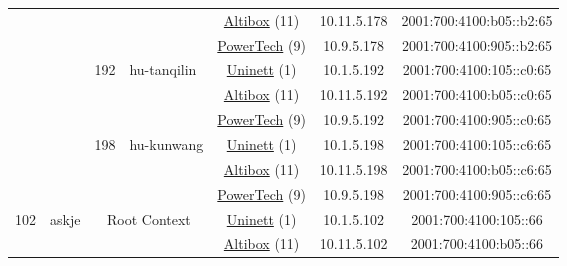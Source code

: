 \begin{small}
\begin{center}
\begin{longtable}{|c|c|c|c|c|c|c|c|}
  &  &  &  & \multicolumn{2}{|c|}{\tiny{\href{https://www.altibox.no}{Altibox} (11)}} & \tiny{10.11.5.178} & \tiny{2001:700:4100:b05::b2:65} \\* \cline{5-5}\cline{6-6}\cline{7-7}\cline{8-8}
  &  &  &  & \multicolumn{2}{|c|}{\tiny{\href{http://www.powertech.no}{PowerTech} (9)}} & \tiny{10.9.5.178} & \tiny{2001:700:4100:905::b2:65} \\* \cline{3-3}\cline{4-4}\cline{5-5}\cline{6-6}\cline{7-7}\cline{8-8}
  &  & \multirow{3}{*}{\tiny{192}} & \multicolumn{1}{|l|}{\multirow{3}{*}{\tiny{hu-tanqilin}}} & \multicolumn{2}{|c|}{\tiny{\href{https://www.uninett.no}{Uninett} (1)}} & \tiny{10.1.5.192} & \tiny{2001:700:4100:105::c0:65} \\* \cline{5-5}\cline{6-6}\cline{7-7}\cline{8-8}
  &  &  &  & \multicolumn{2}{|c|}{\tiny{\href{https://www.altibox.no}{Altibox} (11)}} & \tiny{10.11.5.192} & \tiny{2001:700:4100:b05::c0:65} \\* \cline{5-5}\cline{6-6}\cline{7-7}\cline{8-8}
  &  &  &  & \multicolumn{2}{|c|}{\tiny{\href{http://www.powertech.no}{PowerTech} (9)}} & \tiny{10.9.5.192} & \tiny{2001:700:4100:905::c0:65} \\* \cline{3-3}\cline{4-4}\cline{5-5}\cline{6-6}\cline{7-7}\cline{8-8}
  &  & \multirow{3}{*}{\tiny{198}} & \multicolumn{1}{|l|}{\multirow{3}{*}{\tiny{hu-kunwang}}} & \multicolumn{2}{|c|}{\tiny{\href{https://www.uninett.no}{Uninett} (1)}} & \tiny{10.1.5.198} & \tiny{2001:700:4100:105::c6:65} \\* \cline{5-5}\cline{6-6}\cline{7-7}\cline{8-8}
  &  &  &  & \multicolumn{2}{|c|}{\tiny{\href{https://www.altibox.no}{Altibox} (11)}} & \tiny{10.11.5.198} & \tiny{2001:700:4100:b05::c6:65} \\* \cline{5-5}\cline{6-6}\cline{7-7}\cline{8-8}
  &  &  &  & \multicolumn{2}{|c|}{\tiny{\href{http://www.powertech.no}{PowerTech} (9)}} & \tiny{10.9.5.198} & \tiny{2001:700:4100:905::c6:65} \\ \hline
 \multirow{39}{*}{\tiny{102}} & \multicolumn{1}{|l|}{\multirow{39}{*}{\tiny{askje}}} & \multicolumn{2}{|c|}{\multirow{3}{*}{\tiny{Root Context}}} & \multicolumn{2}{|c|}{\tiny{\href{https://www.uninett.no}{Uninett} (1)}} & \tiny{10.1.5.102} & \tiny{2001:700:4100:105::66} \\* \cline{5-5}\cline{6-6}\cline{7-7}\cline{8-8}
  &  & \multicolumn{2}{|c|}{} & \multicolumn{2}{|c|}{\tiny{\href{https://www.altibox.no}{Altibox} (11)}} & \tiny{10.11.5.102} & \tiny{2001:700:4100:b05::66} \\* \cline{5-5}\cline{6-6}\cline{7-7}\cline{8-8}

\end{longtable}
\end{center}
\end{small}
